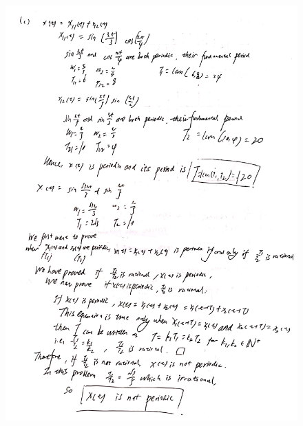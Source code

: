 \documentclass[a4paper]{article}
\begin{document}
\begin{figure}[H]
  \begin{center}
    \includegraphics[width=1\textwidth]{6(c).jpg}
  \end{center}
\end{figure}
\end{document}
